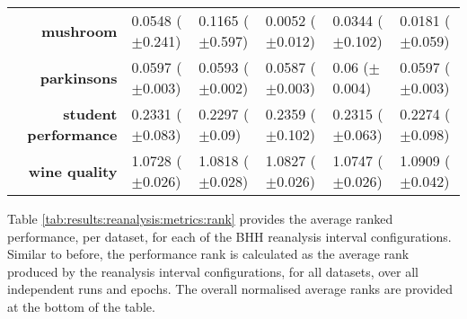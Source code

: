 \begin{table}[htb]
{\begin{tabular}{r|lllll}
                  \textbf{mushroom}            & \cellcolor[rgb]{ .996,  .796,  .494}0.0548 ($\pm$0.241)     & \cellcolor[rgb]{ .973,  .412,  .42}0.1165 ($\pm$0.597)  & \cellcolor[rgb]{ .388,  .745,  .482}0.0052 ($\pm$0.012) & \cellcolor[rgb]{ 1,  .922,  .518}0.0344 ($\pm$0.102)   & \cellcolor[rgb]{ .655,  .82,  .494}0.0181 ($\pm$0.059)  \\
                  \textbf{parkinsons}          & \cellcolor[rgb]{ 1,  .922,  .518}0.0597 ($\pm$0.003)        & \cellcolor[rgb]{ .769,  .855,  .502}0.0593 ($\pm$0.002) & \cellcolor[rgb]{ .388,  .745,  .482}0.0587 ($\pm$0.003) & \cellcolor[rgb]{ .973,  .412,  .42}0.06 ($\pm$0.004)   & \cellcolor[rgb]{ 1,  .918,  .518}0.0597 ($\pm$0.003)    \\
                  \textbf{student performance} & \cellcolor[rgb]{ .992,  .741,  .486}0.2331 ($\pm$0.083)     & \cellcolor[rgb]{ .725,  .839,  .498}0.2297 ($\pm$0.09)  & \cellcolor[rgb]{ .973,  .412,  .42}0.2359 ($\pm$0.102)  & \cellcolor[rgb]{ 1,  .922,  .518}0.2315 ($\pm$0.063)   & \cellcolor[rgb]{ .388,  .745,  .482}0.2274 ($\pm$0.098) \\
                  \textbf{wine quality}        & \cellcolor[rgb]{ .388,  .745,  .482}1.0728 ($\pm$0.026)     & \cellcolor[rgb]{ 1,  .922,  .518}1.0818 ($\pm$0.028)    & \cellcolor[rgb]{ 1,  .871,  .51}1.0827 ($\pm$0.026)     & \cellcolor[rgb]{ .514,  .78,  .486}1.0747 ($\pm$0.026) & \cellcolor[rgb]{ .973,  .412,  .42}1.0909 ($\pm$0.042)  \\
            \end{tabular}%
      }
\end{table}%

Table \ref{tab:results:reanalysis:metrics:rank} provides the average ranked performance, per dataset, for each of the \acs{BHH} reanalysis interval configurations. Similar to before, the performance rank is calculated as the average rank produced by the reanalysis interval configurations, for all datasets, over all independent runs and epochs. The overall normalised average ranks are provided at the bottom of the table.


